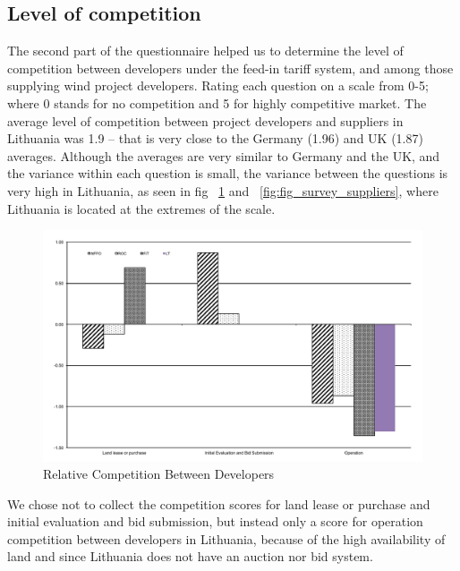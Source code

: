 \documentclass[a4paper, 12pt]{article}
\begin{document}
\subsection{Level of competition}
The second part of the questionnaire helped us to determine the level of competition between developers under the feed-in tariff system, and among those supplying wind project developers. Rating each question on a scale from 0-5; where 0 stands for no competition and 5 for highly competitive market. The average level of competition between project developers and suppliers in Lithuania was 1.9 – that is very close to the Germany (1.96) and UK (1.87) averages. Although the averages are very similar to Germany and the UK, and the variance within each question is small, the variance between the questions is very high in Lithuania, as seen in fig ~\ref{fig:fig_survey_competition} and ~\ref{fig:fig_survey_suppliers}, where Lithuania is located at the extremes of the scale.

\begin{figure}
	\centering
	\includegraphics[width=1\textwidth]{fig_survey_competition}
	\caption{Relative Competition Between Developers}
	\label{fig:fig_survey_competition}
\end{figure}

We chose not to collect the competition scores for land lease or purchase and initial evaluation and bid submission, but instead only a score for operation competition between developers in Lithuania, because of the high availability of land and since Lithuania does not have an auction nor bid system.
\end{document}
